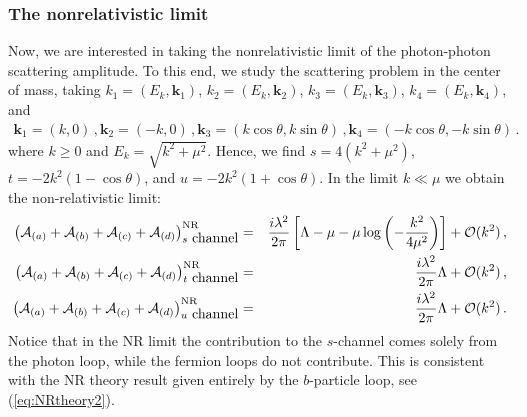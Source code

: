 \documentclass[11pt]{article}
\begin{document}
\subsubsection*{The nonrelativistic limit}

Now, we are interested in taking the nonrelativistic limit of the photon-photon scattering amplitude. To this end, we  study the scattering problem in the center of mass, taking $k_1=(E_k,\bm k_1)$, $k_2=(E_k,\bm k_2)$, $k_3=(E_k,\bm k_3)$, $k_4=(E_k,\bm k_4)$, and
%
\begin{eqnarray}
\bm k_1=(k,0)\,, \bm k_2=(-k,0)\,, \bm k_3=(k\cos \theta,k\sin \theta)\,,  \bm k_4=(-k\cos \theta,-k\sin\theta)\,.
\label{parametrization CM}
\end{eqnarray} 
%
where $k\geq 0$ and $E_k=\sqrt{k^2+\mu^2}$. Hence, we find $s=4(k^2+\mu^2)$, $t=-2k^2(1-\cos\theta)$, and $u=-2k^2(1+\cos\theta)$. In the limit $k \ll \mu$ we obtain the non-relativistic limit:
%
\begin{eqnarray}
\nonumber
\left({\cal A}_{(a)}+{\cal A}_{(b)}+{\cal A}_{(c)}+{\cal A}_{(d)}\right)_{s~\mbox{channel}}^{\scriptsize\mbox{NR}}&=&\frac{i\lambda^2}{2\pi}\left[\Lambda-\mu-\mu \log\left(-\frac{k^2}{4\mu^2}\right) \right]+{\cal O}(k^2)\,,\\
\nonumber
\left({\cal A}_{(a)}+{\cal A}_{(b)}+{\cal A}_{(c)}+{\cal A}_{(d)}\right)_{t~\mbox{channel}}^{\scriptsize\mbox{NR}}&=&\frac{i\lambda^2}{2\pi}\Lambda+{\cal O}(k^2)\,,\\
\left({\cal A}_{(a)}+{\cal A}_{(b)}+{\cal A}_{(c)}+{\cal A}_{(d)}\right)_{u~\mbox{channel}}^{\scriptsize\mbox{NR}}&=&\frac{i\lambda^2}{2\pi}\Lambda+{\cal O}(k^2)\,.
\end{eqnarray}
%
Notice that in the NR limit the contribution to the $s$-channel comes solely from the photon loop, while the fermion loops do not contribute. This is consistent with the NR theory result given entirely by the $b$-particle loop, see (\ref{eq:NRtheory2}).
\end{document}
